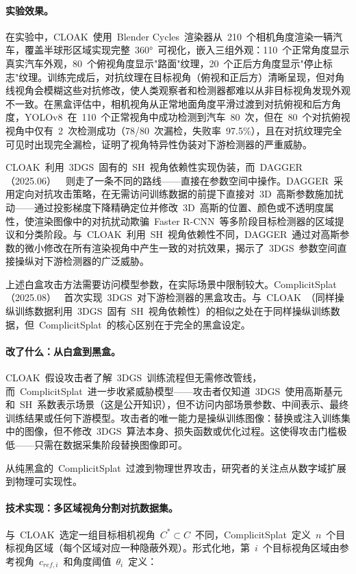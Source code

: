 \paragraph{实验效果。}
在实验中，CLOAK~使用~Blender Cycles~渲染器从~210~个相机角度渲染一辆汽车，覆盖半球形区域实现完整~360°~可视化，嵌入三组外观：110~个正常角度显示真实汽车外观，80~个俯视角度显示"路面"纹理，20~个正后方角度显示"停止标志"纹理。训练完成后，对抗纹理在目标视角（俯视和正后方）清晰呈现，但对角线视角会模糊这些对抗修改，使人类观察者和检测器都难以从非目标视角发现外观不一致。在黑盒评估中，相机视角从正常地面角度平滑过渡到对抗俯视和后方角度，YOLOv8~在~110~个正常视角中成功检测到汽车~80~次，但在~80~个对抗俯视视角中仅有~2~次检测成功（78/80~次漏检，失败率~97.5\%），且在对抗纹理完全可见时出现完全漏检，证明了视角特异性伪装对下游检测器的严重威胁。

CLOAK~利用~3DGS~固有的~SH~视角依赖性实现伪装，而~DAGGER（2025.06）~\cite{2506_00280}~则走了一条不同的路线——直接在参数空间中操作。DAGGER~采用定向对抗攻击策略，在无需访问训练数据的前提下直接对~3D~高斯参数施加扰动——通过投影梯度下降精确定位并修改~3D~高斯的位置、颜色或不透明度属性，使渲染图像中的对抗扰动欺骗~Faster R-CNN~等多阶段目标检测器的区域提议和分类阶段。与~CLOAK~利用~SH~视角依赖性不同，DAGGER~通过对高斯参数的微小修改在所有渲染视角中产生一致的对抗效果，揭示了~3DGS~参数空间直接操纵对下游检测器的广泛威胁。

上述白盒攻击方法需要访问模型参数，在实际场景中限制较大。ComplicitSplat（2025.08）~\cite{2508_11854} 首次实现~3DGS~对下游检测器的黑盒攻击。与~CLOAK~（同样操纵训练数据利用~3DGS~固有~SH~视角依赖性）的相似之处在于同样操纵训练数据，但~ComplicitSplat~的核心区别在于完全的黑盒设定。

\paragraph{改了什么：从白盒到黑盒。}
CLOAK~假设攻击者了解~3DGS~训练流程但无需修改管线，而~ComplicitSplat~进一步收紧威胁模型——攻击者仅知道~3DGS~使用高斯基元和~SH~系数表示场景（这是公开知识），但不访问内部场景参数、中间表示、最终训练结果或任何下游模型。攻击者的唯一能力是操纵训练图像：替换或注入训练集中的图像，但不修改~3DGS~算法本身、损失函数或优化过程。这使得攻击门槛极低——只需在数据采集阶段替换图像即可。

从纯黑盒的~ComplicitSplat~过渡到物理世界攻击，研究者的关注点从数字域扩展到物理可实现性。

\paragraph{技术实现：多区域视角分割对抗数据集。}
与~CLOAK~选定一组目标相机视角~$C^* \subset C$~不同，ComplicitSplat~定义~$n$~个目标视角区域（每个区域对应一种隐蔽外观）。形式化地，第~$i$~个目标视角区域由参考视角~$c_{ref,i}$~和角度阈值~$\theta_i$~定义：

